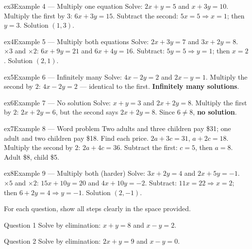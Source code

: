 \documentclass[11pt]{article}
\begin{document}
\begin{example}{ex3}{Example 4 --- Multiply one equation}
Solve: $2x+y=5$ and $x+3y=10$.
\soln Multiply the first by $3$: $6x+3y=15$. Subtract the second: $5x=5\Rightarrow x=1$; then $y=3$. Solution $(1,3)$.
\end{example}

\begin{example}{ex4}{Example 5 --- Multiply both equations}
Solve: $2x+3y=7$ and $3x+2y=8$.
\soln $\times3$ and $\times2$: $6x+9y=21$ and $6x+4y=16$. Subtract: $5y=5\Rightarrow y=1$; then $x=2$. Solution $(2,1)$.
\end{example}

\begin{example}{ex5}{Example 6 --- Infinitely many}
Solve: $4x-2y=2$ and $2x-y=1$.
\soln Multiply the second by $2$: $4x-2y=2$ --- identical to the first. \textbf{Infinitely many solutions}.
\end{example}

\begin{example}{ex6}{Example 7 --- No solution}
Solve: $x+y=3$ and $2x+2y=8$.
\soln Multiply the first by $2$: $2x+2y=6$, but the second says $2x+2y=8$. Since $6\neq8$, \textbf{no solution}.
\end{example}

\begin{example}{ex7}{Example 8 --- Word problem}
Two adults and three children pay \$31; one adult and two children pay \$18. Find each price.
\soln $2a+3c=31$, $a+2c=18$. Multiply the second by $2$: $2a+4c=36$. Subtract the first: $c=5$, then $a=8$. Adult \$8, child \$5.
\end{example}

\begin{example}{ex8}{Example 9 --- Multiply both (harder)}
Solve: $3x+2y=4$ and $2x+5y=-1$.
\soln $\times5$ and $\times2$: $15x+10y=20$ and $4x+10y=-2$. Subtract: $11x=22\Rightarrow x=2$; then $6+2y=4\Rightarrow y=-1$. Solution $(2,-1)$.
\end{example}

\clearpage
{}
For each question, show all steps clearly in the space provided.

\begin{qbox}{Question 1}
Solve by elimination: $x+y=8$ and $x-y=2$.\workspace{2.4cm}
\end{qbox}

\begin{qbox}{Question 2}
Solve by elimination: $2x+y=9$ and $x-y=0$.\workspace{2.4cm}
\end{qbox}
\end{document}
